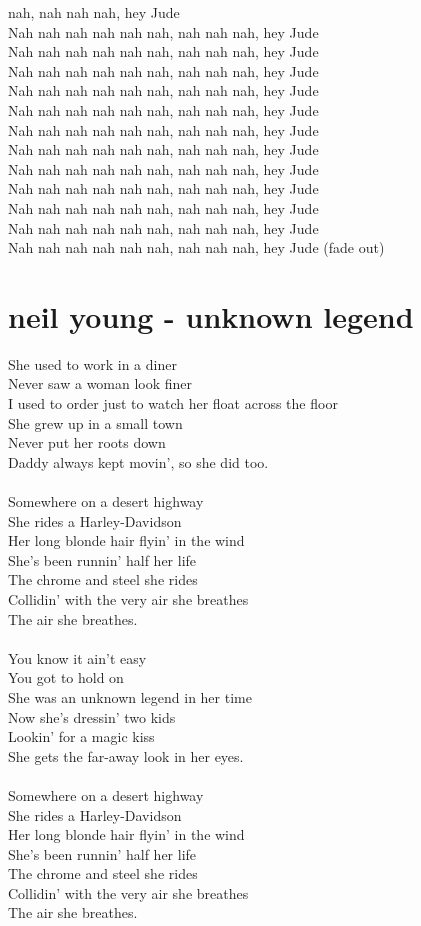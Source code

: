 \documentclass[a4paper,12pt]{book} %
\begin{document}
\begin{multicols}{2}
{nah, nah nah nah, hey Jude\\Nah nah nah nah nah nah, nah nah nah, hey Jude\\Nah nah nah nah nah nah, nah nah nah, hey Jude\\Nah nah nah nah nah nah, nah nah nah, hey Jude\\Nah nah nah nah nah nah, nah nah nah, hey Jude\\Nah nah nah nah nah nah, nah nah nah, hey Jude\\Nah nah nah nah nah nah, nah nah nah, hey Jude\\Nah nah nah nah nah nah, nah nah nah, hey Jude\\Nah nah nah nah nah nah, nah nah nah, hey Jude\\Nah nah nah nah nah nah, nah nah nah, hey Jude\\Nah nah nah nah nah nah, nah nah nah, hey Jude\\Nah nah nah nah nah nah, nah nah nah, hey Jude\\Nah nah nah nah nah nah, nah nah nah, hey Jude (fade out)
\chapter{neil young - unknown legend}
\noindent
She used to work in a diner\\Never saw a woman look finer\\I used to order just to watch her float across the floor\\She grew up in a small town\\Never put her roots down\\Daddy always kept movin', so she did too.\\\\Somewhere on a desert highway\\She rides a Harley-Davidson\\Her long blonde hair flyin' in the wind\\She's been runnin' half her life\\The chrome and steel she rides\\Collidin' with the very air she breathes\\The air she breathes.\\\\You know it ain't easy\\You got to hold on\\She was an unknown legend in her time\\Now she's dressin' two kids\\Lookin' for a magic kiss\\She gets the far-away look in her eyes.\\\\Somewhere on a desert highway\\She rides a Harley-Davidson\\Her long blonde hair flyin' in the wind\\She's been runnin' half her life\\The chrome and steel she rides\\Collidin' with the very air she breathes\\The air she breathes.
}
\end{multicols}
\end{document}

